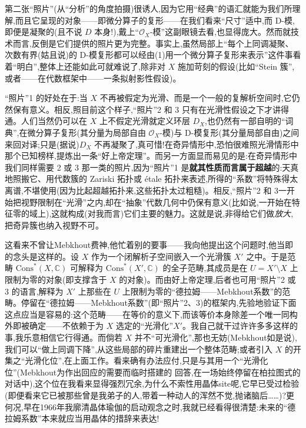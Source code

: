 \noindent 第二张“照片”(从“分析”的角度拍摄)很诱人,因为它用“经典”的语汇就能为我们所理解,而且它呈现的对象——即微分算子的复形——在我们看来“尺寸”适中,而 D-模,即便是凝聚的(且不说 $D$ 本身!),戴上“$\mathcal{O}_{X}$-模”这副眼镜去看,也显得庞大。然而就技术而言,反倒是它们提供的照片更为完整。事实上,虽然局部上“每个上同调凝聚、次数有界(姑且说)的 D-模复形都可以经由(1)用一个微分算子复形来表示”这件事看着“明白”,整体上还能如此可就难说了,除非对 $X$ 施加苛刻的假设(比如“Stein 簇”,或者——在代数框架中——一条拟射影性假设)。

\noindent “照片”1 的好处在于:当 $X$ 不再被假定为光滑、而是一个一般的复解析空间时,它仍然保有意义。相反,照目前这个样子,“照片”2 和 3 只有在光滑性假设之下才讲得通。人们当然仍可以在 $X$ 上不假定光滑就定义环层 $D_{X}$,也仍然有一部自明的“词典”,在微分算子复形(其分量为局部自由 $\mathcal{O}_{X}$-模)与 D-模复形(其分量局部自由)之间来回对译;只是(据说)$D_{X}$ 不再凝聚了,真可惜!在奇异情形中,恐怕很难照光滑情形中那个已知榜样,提炼出一条“好上帝定理”。而另一方面显而易见的是:在奇异情形中我们同样需要 2 或 3 那一类的照片,因为“照片”1 是\textbf{就其性质而言属于超越}的:天真地照搬它、用代数簇的 Zariski 拓扑或 étale 拓扑来表述,所得的“系数”将特殊得太离谱,不堪使用(因为比起超越拓扑来,\dmark{}这些拓扑太过粗糙)。相反,“照片”2 和 3一开始把视野限制在“光滑”之内,却在“抽象”代数几何中仍保有意义(比如说,一开始在特征零的域上),这就构成(对我而言)它们主要的魅力。这就是说,非得给它们做\emph{放大},把奇异簇也纳入视野不可。

\noindent 这看来不曾让Mebkhout费神,他忙着别的要事——我向他提出这个问题时,他当即的念头是这样的。设 $X$ 作为一个闭解析子空间嵌入一个光滑簇 $X'$ 之中。于是范畴 $\mathrm{Cons}^{*}(X,\mathbb{C})$ 可解释为 $\mathrm{Cons}^{*}(X',\mathbb{C})$ 的全子范畴,其成员是在 $U=X'\setminus X$ 上限制为零的对象(即支撑含于 $X$ 的对象)。而由好上帝定理,后者也可用“照片”2 或 3 的语言,解释为 $X'$ 上那些在 $U$ 上限制为零的“德拉姆——Mebkhout系数”的范畴。停留在“德拉姆——Mebkhout系数”(即“照片”2、3)的框架内,先验地验证下面这点应当是容易的:这个范畴——在等价的意义下,而该等价本身除差一个唯一同构外即被确定——不依赖于为 $X$ 选定的“光滑化”$X'$。我自己就干过许许多多这样的事,我乐意相信它行得通。而倘若 $X$ 并不“可光滑化”,那也无妨(Mebkhout如是说),我们可以“做上同调下降”,从这些局部的碎片重建出一个整体范畴;或者引入 $X$ 的开集之“光滑化位”,在上面工作。看来确有办法应付,只是与其用一个“光滑化位”(Mebkhout为作出回应的需要而临时搭建的
回答,在一场始终停留在柏拉图式的对话中),这个位在我看来显得强烈冗余,为什么不索性用晶体site呢,它早已受过检验(即便看来它已被那些曾是我弟子的人,带着一种动人的浑然不觉,抛诸脑后……)?更何况,早在1966年我廓清晶体瑜伽的启动观念之时,我就已经看得很清楚:未来的“德拉姆系数”本来就应当用晶体的措辞来表达!

